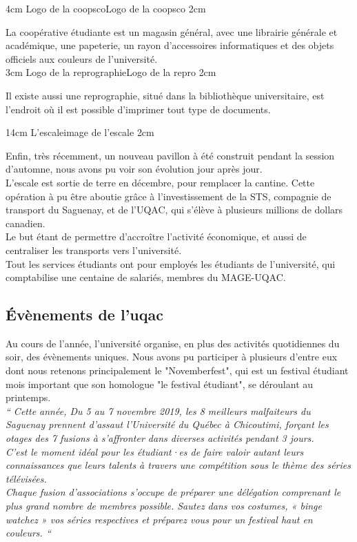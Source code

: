 {4cm}
{Logo de la coopsco}{Logo de la coopsco}
{2cm}

La coopérative étudiante est un magasin général, avec une librairie générale et académique, une papeterie, un rayon d'accessoires informatiques et des objets officiels aux couleurs de l'université.\\

{3cm}
{Logo de la reprographie}{Logo de la repro}
{2cm}

Il existe aussi une reprographie, situé dans la bibliothèque universitaire, est l'endroit où il est possible d'imprimer tout type de documents.

{14cm}
{L'escale}{image de l'escale}
{2cm}

Enfin, très récemment, un nouveau pavillon à été construit pendant la session d'automne, nous avons pu voir son évolution jour après jour.\\
L'escale est sortie de terre en décembre, pour remplacer la cantine. Cette opération à pu être aboutie grâce à l'investissement de la STS, compagnie de transport du Saguenay, et de l'UQAC, qui s'élève à plusieurs millions de dollars canadien.\\
Le but étant de permettre d'accroître l'activité économique, et aussi de centraliser les transports vers l'université.\\

Tout les services étudiants ont pour employés les étudiants de l'université, qui comptabilise une centaine de salariés, membres du MAGE-UQAC.\\

\subsection{Évènements de l'uqac}

Au cours de l'année, l'université organise, en plus des activités quotidiennes du soir, des évènements uniques. Nous avons pu participer à plusieurs d'entre eux dont nous retenons principalement le "Novemberfest", qui est un festival étudiant mois important que son homologue "le festival étudiant", se déroulant au printemps.\\

\textit{``
Cette année, Du 5 au 7 novembre 2019, les 8 meilleurs malfaiteurs du Saguenay prennent d’assaut l’Université du Québec à Chicoutimi, forçant les otages des 7 fusions à s’affronter dans diverses activités pendant 3 jours.\\
C’est le moment idéal pour les étudiant·es de faire valoir autant leurs connaissances que leurs talents à travers une compétition sous le
thème des séries télévisées.\\
Chaque fusion d’associations s’occupe de préparer une délégation comprenant le plus grand nombre de membres possible.
Sautez dans vos costumes, « binge watchez » vos séries respectives et préparez vous pour un festival haut en couleurs.
``}\\
\\

